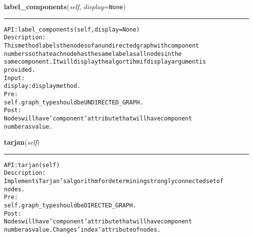     \label{coinor:gimpy:graph:Graph:label_components}

    \vspace{0.5ex}

\hspace{.8\funcindent}\begin{boxedminipage}{\funcwidth}

    \raggedright \textbf{label\_components}(\textit{self}, \textit{display}={\tt None})

    \vspace{-1.5ex}

    \rule{\textwidth}{0.5\fboxrule}
\setlength{\parskip}{2ex}
\begin{alltt}

API: label\_components(self, display=None)
Description:
This method labels the nodes of an undirected graph with component
numbers so that each node has the same label as all nodes in the
same component. It will display the algortihm if display argument is
provided.
Input:
    display: display method.
Pre:
    self.graph\_type should be UNDIRECTED\_GRAPH.
Post:
    Nodes will have 'component' attribute that will have component
    number as value.
\end{alltt}

\setlength{\parskip}{1ex}
    \end{boxedminipage}

    \label{coinor:gimpy:graph:Graph:tarjan}

    \vspace{0.5ex}

\hspace{.8\funcindent}\begin{boxedminipage}{\funcwidth}

    \raggedright \textbf{tarjan}(\textit{self})

    \vspace{-1.5ex}

    \rule{\textwidth}{0.5\fboxrule}
\setlength{\parskip}{2ex}
\begin{alltt}

API: tarjan(self)
Description:
Implements Tarjan's algorithm for determining strongly connected set of
nodes.
Pre:
    self.graph\_type should be DIRECTED\_GRAPH.
Post:
    Nodes will have 'component' attribute that will have component
    number as value. Changes 'index' attribute of nodes.
\end{alltt}

\setlength{\parskip}{1ex}
    \end{boxedminipage}

